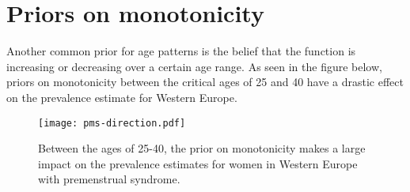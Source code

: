 \section{Priors on monotonicity}
Another common prior for age patterns is the belief that the function is increasing or decreasing over a certain age range.  As seen in the figure below, priors on monotonicity between the critical ages of 25 and 40 have a drastic effect on the prevalence estimate for Western Europe.

    \begin{figure}
        \begin{center}
            \texttt{[image: pms-direction.pdf]}
        \end{center}
        \caption{Between the ages of 25-40, the prior on monotonicity makes a large impact on the prevalence estimates for women in Western Europe with premenstrual syndrome.}
        \label{fig:app-knot_loc}
    \end{figure} 